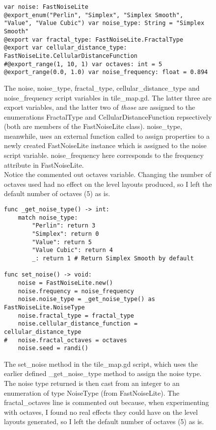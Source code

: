 \begin{figure}[H]
    \centering
    \begin{lstlisting}
var noise: FastNoiseLite
@export_enum("Perlin", "Simplex", "Simplex Smooth", "Value", "Value Cubic") var noise_type: String = "Simplex Smooth"
@export var fractal_type: FastNoiseLite.FractalType
@export var cellular_distance_type: FastNoiseLite.CellularDistanceFunction
#@export_range(1, 10, 1) var octaves: int = 5 
@export_range(0.0, 1.0) var noise_frequency: float = 0.894
    \end{lstlisting}
    \caption{The noise, noise\_type, fractal\_type, cellular\_distance\_type and noise\_frequency script variables in tile\_map.gd. The latter three are export variables, and the latter two of \textit{those} are assigned to the enumerations FractalType and CellularDistanceFunction repsectively (both are members of the FastNoiseLite class).\cite{fastnoiselitedocs} noise\_type, meanwhile, uses an external function called to assign properties to a newly created FastNoiseLite instance which is assigned to the noise script variable. noise\_frequency here corresponds to the frequency attribute in FastNoiseLite.\\Notice the commented out octaves variable. Changing the number of octaves used had no effect on the level layouts produced, so I left the default number of octaves (5) as is.}
    \label{fig:simplex1}
\end{figure}

\begin{figure}[H]
    \centering
    \begin{lstlisting}
func _get_noise_type() -> int:
	match noise_type:
		"Perlin": return 3
		"Simplex": return 0
		"Value": return 5
		"Value Cubic": return 4
		_: return 1 # Return Simplex Smooth by default

func set_noise() -> void:
	noise = FastNoiseLite.new()
	noise.frequency = noise_frequency
	noise.noise_type = _get_noise_type() as FastNoiseLite.NoiseType
	noise.fractal_type = fractal_type
	noise.cellular_distance_function = cellular_distance_type
#	noise.fractal_octaves = octaves
	noise.seed = randi()
    \end{lstlisting}
    \caption{The set\_noise method in the tile\_map.gd script, which uses the earlier defined \_get\_noise\_type method to assign the noise type. The noise type returned is then cast from an integer to an enumeration of type NoiseType (from FastNoiseLite). The fractal\_octaves line is commented out because, when experimenting with octaves, I found no real effects they could have on the level layouts generated, so I left the default number of octaves (5) as is.}
    \label{fig:simplex2}
\end{figure}

